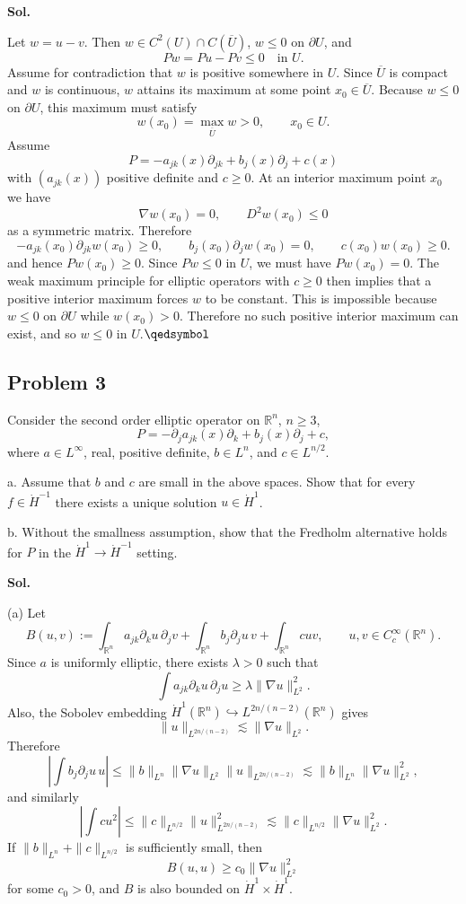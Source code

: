 \documentclass[lang=en,11pt,a4paper,citestyle=authoryear]{elegantpaper}
\newcommand{\prvd}{$\hfill \qedsymbol$}
\newcommand{\R}{\mathbb{R}}
\begin{document}
\vspace{0.5em}
\textbf{Sol.} \par
Let $w=u-v$. Then $w\in C^2(U)\cap C(\overline U)$, $w\leq 0$ on $\partial U$, and
\[
Pw = Pu-Pv \leq 0 \quad \text{in }U.
\]
Assume for contradiction that $w$ is positive somewhere in $U$. Since $\overline U$ is compact and $w$ is continuous, $w$ attains its maximum at some point $x_0\in \overline U$. Because $w\leq 0$ on $\partial U$, this maximum must satisfy
\[
w(x_0)=\max_{\overline U} w >0, \qquad x_0\in U.
\]
Assume
\[
P = -a_{jk}(x)\partial_{jk} + b_j(x)\partial_j + c(x)
\]
with $(a_{jk}(x))$ positive definite and $c\geq 0$. At an interior maximum point $x_0$ we have
\[
\nabla w(x_0)=0, \qquad D^2w(x_0)\leq 0
\]
as a symmetric matrix. Therefore
\[
-a_{jk}(x_0)\partial_{jk}w(x_0) \geq 0,
\qquad b_j(x_0)\partial_j w(x_0)=0,
\qquad c(x_0)w(x_0)\geq 0.
\]
and hence
\(
Pw(x_0)\geq 0.
\)
Since $Pw\leq 0$ in $U$, we must have $Pw(x_0)=0$. The weak maximum principle for elliptic operators with $c\geq 0$ then implies that a positive interior maximum forces $w$ to be constant. This is impossible because $w\leq 0$ on $\partial U$ while $w(x_0)>0$. Therefore no such positive interior maximum can exist, and so $w\leq 0$ in $U$.\prvd

\vspace{0.5em}

\subsection*{Problem 3}
Consider the second order elliptic operator on $\R^n$, $n\geq 3$,
\[
P = -\partial_j a_{jk}(x)\partial_k + b_j(x)\partial_j + c,
\]
where $a\in L^\infty$, real, positive definite, $b\in L^n$, and $c\in L^{n/2}$.\par
a. Assume that $b$ and $c$ are small in the above spaces. Show that for every $f\in \dot H^{-1}$ there exists a unique solution $u\in \dot H^1$.\par
b. Without the smallness assumption, show that the Fredholm alternative holds for $P$ in the $\dot H^1\to \dot H^{-1}$ setting.

\vspace{0.5em}
\textbf{Sol.} \par
(a) Let
\[
B(u,v) := \int_{\R^n} a_{jk}\partial_k u\,\partial_j v
+ \int_{\R^n} b_j\partial_j u\,v
+ \int_{\R^n} cuv,
\qquad u,v\in C_c^\infty(\R^n).
\]
Since $a$ is uniformly elliptic, there exists $\lambda>0$ such that
\[
\int a_{jk}\partial_k u\,\partial_j u \geq \lambda \|\nabla u\|_{L^2}^2.
\]
Also, the Sobolev embedding $\dot H^1(\R^n)\hookrightarrow L^{2n/(n-2)}(\R^n)$ gives
\[
\|u\|_{L^{2n/(n-2)}} \lesssim \|\nabla u\|_{L^2}.
\]
Therefore
\[
\left|\int b_j\partial_j u\,u\right|
\leq \|b\|_{L^n}\|\nabla u\|_{L^2}\|u\|_{L^{2n/(n-2)}}
\lesssim \|b\|_{L^n}\|\nabla u\|_{L^2}^2,
\]
and similarly
\[
\left|\int cu^2\right|
\leq \|c\|_{L^{n/2}}\|u\|_{L^{2n/(n-2)}}^2
\lesssim \|c\|_{L^{n/2}}\|\nabla u\|_{L^2}^2.
\]
If $\|b\|_{L^n}+\|c\|_{L^{n/2}}$ is sufficiently small, then
\[
B(u,u)\geq c_0\|\nabla u\|_{L^2}^2
\]
for some $c_0>0$, and $B$ is also bounded on $\dot H^1\times \dot H^1$.
\end{document}
